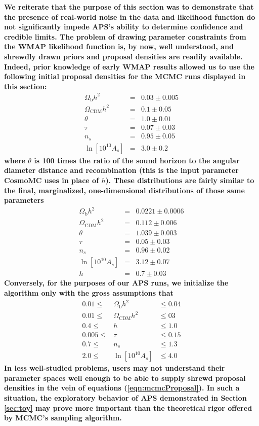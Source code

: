 \documentclass[useAMS,usenatbib]{aastex}
\begin{document}
{\bf %
We reiterate that the purpose of this section was to demonstrate that the presence of
real-world noise in the data and likelihood function do not significantly impede APS's
ability to determine confidence and credible limits.  The problem of drawing parameter
constraints from the WMAP likelihood function is, by now, well understood, and shrewdly
drawn priors and proposal densities are readily available.  
Indeed, prior knowledge of early WMAP results allowed us to use the following 
initial proposal densities for the MCMC runs displayed in this section:
\begin{eqnarray}
\Omega_\text{b}h^2&=&0.03\pm0.005\label{eqn:mcmcProposal}\\
\Omega_\text{CDM}h^2&=&0.1\pm0.05\nonumber\\
\theta&=&1.0\pm0.01\nonumber\\
\tau&=&0.07\pm0.03\nonumber\\
n_s&=&0.95\pm0.05\nonumber\\
\ln\left[10^{10}A_s\right]&=&3.0\pm0.2\nonumber
\end{eqnarray}
where $\theta$ is 100 times the ratio of the sound horizon to the angular diameter
distance and recombination (this is the input parameter CosmoMC uses in place of $h$).
These distributions are fairly similar to the final, 
marginalized, one-dimensional distributions of
those same parameters
\begin{eqnarray}
\Omega_\text{b}h^2&=&0.0221\pm0.0006\nonumber\\
\Omega_\text{CDM}h^2&=&0.112\pm0.006\nonumber\\
\theta&=&1.039\pm0.003\nonumber\\
\tau&=&0.05\pm0.03\nonumber\\
n_s&=&0.96\pm0.02\nonumber\\
\ln\left[10^{10}A_s\right]&=&3.12\pm0.07\nonumber\\
h&=&0.7\pm0.03\nonumber
\end{eqnarray}
Conversely, for the purposes of our APS runs, we initialize the algorithm only with the
gross assumptions that
\begin{eqnarray}
0.01\le&\Omega_\text{b}h^2&\le0.04\label{eqn:apsProposal}\\
0.01\le&\Omega_\text{CDM}h^2&\le03\nonumber\\
0.4\le&h&\le1.0\nonumber\\
0.005\le&\tau&\le0.15\nonumber\\
0.7\le&n_s&\le1.3\nonumber\\
2.0\le&\ln\left[10^{10}A_s\right]&\le4.0\nonumber
\end{eqnarray}
In less well-studied problems, users may not understand their parameter spaces
well enough to be able to supply shrewd proposal densities in the vein of equations 
(\ref{eqn:mcmcProposal}).  In such a situation, the
exploratory behavior of APS demonstrated in Section \ref{sec:toy} 
may prove more important
than the theoretical rigor offered by MCMC's sampling algorithm.
}%
\end{document}
